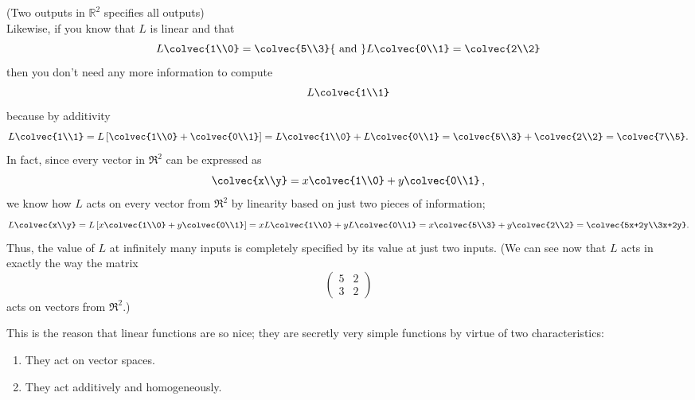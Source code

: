 \begin{example}(Two outputs in $\mathbb{R}^2$ specifies all outputs)\\
Likewise, if you  know that $L$ is linear and that
\[
L\colvec{1\\0}=\colvec{5\\3} {\rm ~and~} L\colvec{0\\1}= \colvec{2\\2}
\] 
then you don't need any more information to compute
\[L\colvec{1\\1}\] because by additivity
\[
L\colvec{1\\1}= L \left[ \colvec{1\\0} + \colvec{0\\1} \right] 
=L\colvec{1\\0} + L \colvec{0\\1} = \colvec{5\\3} +\colvec{2\\2} =\colvec{7\\5}.
\]
In fact, since every vector in $\Re^2$ can be expressed as 
\[
\colvec{x\\y}= x\colvec{1\\0}+y\colvec{0\\1}\, ,
\] 
we know how $L$ acts on every vector from 
$\Re^2$ by linearity based on just  two pieces of information;
\[
L\colvec{x\\y}
= L \left[ x\colvec{1\\0}+y\colvec{0\\1} \right]
= x L\colvec{1\\0}+y L\colvec{0\\1} 
= x \colvec{5\\3}+ y\colvec{2\\2} =\colvec{5x+2y\\3x+2y}.
\]
Thus, the value of $L$ at infinitely many inputs is completely specified by its value at just two inputs.
(We can see now that $L$ acts in exactly the way the matrix 
\[
\begin{pmatrix}
5&2\\
3&2 \end{pmatrix}
\]
acts on vectors from $\Re^2$.)
\end{example}


This is the reason that linear functions are so nice;
they are secretly very simple functions by virtue of two characteristics:
\begin{enumerate}\item They act on vector spaces.
\item They act additively and homogeneously. 
\end{enumerate}


